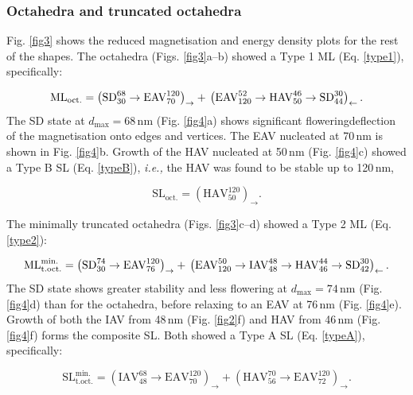 \documentclass[review,authoryear]{elsarticle}
\newcommand{\dmax}{d_\text{max}}
\newcommand{\nm}{\,\text{nm}}
\begin{document}
\subsubsection{Octahedra and truncated octahedra}
Fig. \ref{fig3} shows the reduced magnetisation and energy density plots for the rest of the shapes. The octahedra (Figs. \ref{fig3}a--b) showed a Type 1 ML (Eq. \ref{type1}), specifically:
{\par\nobreak\noindent}
\begin{equation}
\text{ML}_{\text{oct.}}=\left(\text{SD}_{30}^{68}\rightarrow\text{EAV}_{70}^{120}\right)_{\rightarrow} + \\
\left(\text{EAV}_{120}^{52}\rightarrow\text{HAV}_{50}^{46}\rightarrow\text{SD}_{44}^{30}\right)_{\leftarrow}.
\end{equation}
The SD state at $\dmax=68\,\text{nm}$ (Fig. \ref{fig4}a) shows significant flowering{\textemdash}deflection of the magnetisation onto edges and vertices. The EAV nucleated at 70$\nm$ is shown in Fig. \ref{fig4}b. Growth of the HAV nucleated at 50$\nm$ (Fig. \ref{fig4}c) showed a Type B SL (Eq. \ref{typeB}), \textit{i.e.,} the HAV was found to be stable up to 120$\nm$,
{\par\nobreak\noindent}
\begin{equation}
\text{SL}_{\text{oct.}}=\left(\text{HAV}_{50}^{120}\right)_{\rightarrow}.
\end{equation}

The minimally truncated octahedra (Figs. \ref{fig3}c--d) showed a Type 2 ML (Eq. \ref{type2}):
{\par\nobreak\noindent}
\begin{equation}
\text{ML}_{\text{t.oct.}}^{\text{min.}}=\left(\text{SD}_{30}^{74}\rightarrow\text{EAV}_{76}^{120}\right)_{\rightarrow} + \\
 \left(\text{EAV}_{120}^{50}\rightarrow\text{IAV}_{48}^{48}\rightarrow\text{HAV}_{46}^{44}\rightarrow\text{SD}_{42}^{30}\right)_{\leftarrow}.
\end{equation}
The SD state shows greater stability and less flowering at $\dmax=74\,\text{nm}$ (Fig. \ref{fig4}d) than for the octahedra, before relaxing to an EAV at 76$\nm$ (Fig. \ref{fig4}e). Growth of both the IAV from 48$\nm$ (Fig. \ref{fig2}f) and HAV from 46$\nm$ (Fig. \ref{fig4}f) forms the composite SL. Both showed a Type A SL (Eq. \ref{typeA}), specifically:
{\par\nobreak\noindent}
\begin{equation}
\text{SL}_{\text{t.oct.}}^{\text{min.}}=\left(\text{IAV}_{48}^{68}\rightarrow\text{EAV}_{70}^{120}\right)_{\rightarrow} + \left(\text{HAV}_{56}^{70}\rightarrow\text{EAV}_{72}^{120}\right)_{\rightarrow}.
\end{equation}\par
\end{document}
